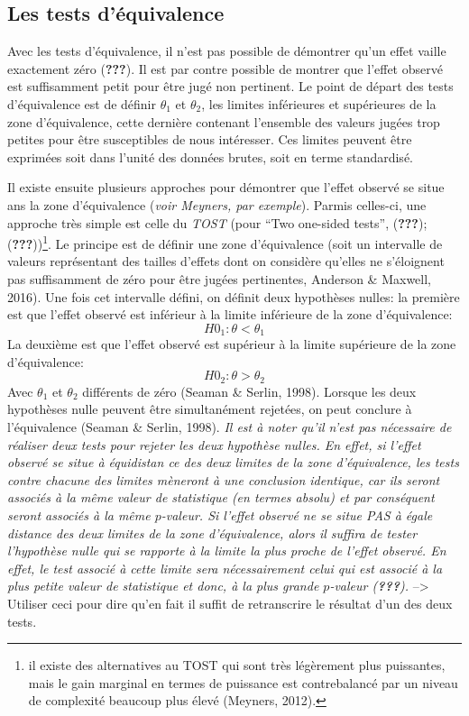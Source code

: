 \documentclass[
  english,
  man]{apa6}
\begin{document}
\hypertarget{les-tests-duxe9quivalence}{%
\subsection{Les tests d'équivalence}\label{les-tests-duxe9quivalence}}

Avec les tests d'équivalence, il n'est pas possible de démontrer qu'un effet vaille exactement zéro ({\textbf{???}}). Il est par contre possible de montrer que l'effet observé est suffisamment petit pour être jugé non pertinent. Le point de départ des tests d'équivalence est de définir \(\theta_1\) et \(\theta_2\), les limites inférieures et supérieures de la zone d'équivalence, cette dernière contenant l'ensemble des valeurs jugées trop petites pour être susceptibles de nous intéresser. Ces limites peuvent être exprimées soit dans l'unité des données brutes, soit en terme standardisé.

Il existe ensuite plusieurs approches pour démontrer que l'effet observé se situe ans la zone d'équivalence (\emph{voir Meyners, par exemple}). Parmis celles-ci, une approche très simple est celle du \emph{TOST} (pour \enquote{Two one-sided tests}, ({\textbf{???}}); ({\textbf{???}}))\footnote{il existe des alternatives au TOST qui sont très légèrement plus puissantes, mais le gain marginal en termes de puissance est contrebalancé par un niveau de complexité beaucoup plus élevé (Meyners, 2012).}. Le principe est de définir une zone d'équivalence (soit un intervalle de valeurs représentant des tailles d'effets dont on considère qu'elles ne s'éloignent pas suffisamment de zéro pour être jugées pertinentes, Anderson \& Maxwell, 2016). Une fois cet intervalle défini, on définit deux hypothèses nulles: la première est que l'effet observé est inférieur à la limite inférieure de la zone d'équivalence: \[H0_1: \theta < \theta_1\] La deuxième est que l'effet observé est supérieur à la limite supérieure de la zone d'équivalence: \[H0_2: \theta > \theta_2\] Avec \(\theta_1\) et \(\theta_2\) différents de zéro (Seaman \& Serlin, 1998). Lorsque les deux hypothèses nulle peuvent être simultanément rejetées, on peut conclure à l'équivalence (Seaman \& Serlin, 1998). \emph{Il est à noter qu'il n'est pas nécessaire de réaliser deux tests pour rejeter les deux hypothèse nulles. En effet, si l'effet observé se situe à équidistan
ce des deux limites de la zone d'équivalence, les tests contre chacune des limites mèneront à une conclusion identique, car ils seront associés à la même valeur de statistique (en termes absolu) et par conséquent seront associés à la même \(p\)-valeur. Si l'effet observé ne se situe PAS à égale distance des deux limites de la zone d'équivalence, alors il suffira de tester l'hypothèse nulle qui se rapporte à la limite la plus proche de l'effet observé. En effet, le test associé à cette limite sera nécessairement celui qui est associé à la plus petite valeur de statistique et donc, à la plus grande \(p\)-valeur ({\textbf{???}}).} --\textgreater{} Utiliser ceci pour dire qu'en fait il suffit de retranscrire le résultat d'un des deux tests.
\end{document}
